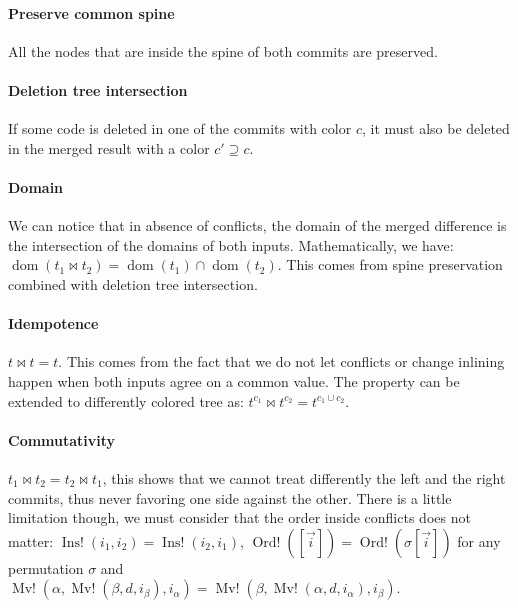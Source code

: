 \documentclass[a4paper,11pt]{article}
\newcommand\merge{\mathbin{\Join}}
\DeclareMathOperator\InsConflict{Ins!}
\DeclareMathOperator\OrdConflict{Ord!}
\DeclareMathOperator\MvConflict{Mv!}
\DeclareMathOperator\dom{dom}
\newcommand\yrg[1]{}%
\newcommand\gb[1]{}%
\begin{document}
\paragraph{Preserve common spine}
All the nodes that are inside the spine of both commits are preserved.

\paragraph{Deletion tree intersection}
If some code is deleted in one of the commits with color $c$, it must also be deleted in the merged result with a color $c' \supseteq c$.

\paragraph{Domain}
We can notice that in absence of conflicts, the domain of the
merged difference is the intersection of the domains of both
inputs. Mathematically, we have: $\dom(t_1 \merge t_2) = \dom(t_1)
\cap \dom(t_2)$. This comes from spine preservation combined with
deletion tree intersection.
\yrg{Notice that you never formally defined the domain of the
merged difference.}\gb{Isn't the interpretation of differences as functions from \ref{sec:diff_application} implicitly defining it?}

\paragraph{Idempotence}
$t \merge t = t$. This comes from the fact that we do not let
conflicts or change inlining happen when both inputs agree on a common value. The property can be extended to differently colored tree as: $t^{c_1} \merge
t^{c_2} = t^{c_1 \cup c_2}$.

\paragraph{Commutativity}
$t_1 \merge t_2 = t_2 \merge t_1$, this shows that we cannot treat differently the left and the right commits, thus never favoring one side against the other. There is a little limitation though, we must consider that the order inside
conflicts does not matter: $\InsConflict(i_1, i_2) = \InsConflict(i_2,
i_1)$, $\OrdConflict([\overrightarrow{i}]) =
\OrdConflict(\sigma[\overrightarrow{i}])$ for any permutation $\sigma$
and $\MvConflict(\alpha, \MvConflict(\beta, d, i_\beta), i_\alpha) =
\MvConflict(\beta, \MvConflict(\alpha, d, i_\alpha), i_\beta)$.
\end{document}
